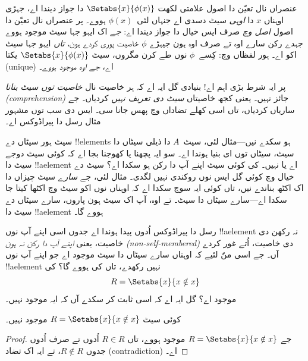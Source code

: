 \documentclass[../../../include/open-logic-section]{subfiles}
\begin{document}

عنصراں نال تعیّن دا اصول علامتی لکھت $\Setabs{x}{\phi(x)}$ دا جواز دیندا
اے، جہڑی اوہناں $x$ دا \emph{اوہی} سیٹ دسدی اے جنہاں لئی~$\phi(x)$
ہووے۔ پر عنصراں نال تعیّن دا اصول \emph{اصل وچ} صرف ایس خیال دا جواز
دیندا اے: \emph{جے} اک ایہو جہا سیٹ موجود ہووے جہدے رکن سارے اوہ تے صرف
اوہ ہون جیہڑے $\phi$ خاصیت پوری کردے ہون، \emph{تاں} ایہو جہا سیٹ اکو اے۔
ہور لفظاں وچ: کِسے~$\phi$ نوں طے کرن مگروں، سیٹ
$\Setabs{x}{\phi(x)}$ یکتا (unique) اے،
\emph{جے اوہ موجود ہووے}۔

پر ایہ شرط بڑی اہم اے!{} بنیادی گل ایہ اے کہ ہر خاصیت نال
\emph{خاصیت توں سیٹ بنانا (comprehension)} جائز نہیں۔ یعنی کجھ خاصیتاں
\emph{سیٹ دی تعریف نہیں} کردیاں۔ جے ساریاں کردیاں، تاں اسی کھلے تضاداں
وچ پھس جانا سی۔ ایس دی سب توں مشہور مثال رسل دا پیراڈوکس اے۔

سیٹ ہور سیٹاں دے !!{element}s ہو سکدے نیں---مثال لئی، سیٹ~$A$ دا ذیلی
سیٹاں دا سیٹ، سیٹاں توں ای بنیا ہوندا اے۔ سو ایہ پچھنا یا کھوجنا بجا اے
کہ کوئی سیٹ دوجے سیٹ دا !!a{element} اے یا نہیں۔ کی کوئی سیٹ اپنے آپ دا
رکن ہو سکدا اے؟ سیٹ دے خیال وچ کوئی گل ایس نوں روکندی نہیں لگدی۔ مثال
لئی، جے \emph{سارے} سیٹ چیزاں دا اک اکٹھ بناندے نیں، تاں کوئی ایہ سوچ
سکدا اے کہ اوہناں نوں اکو سیٹ وچ اکٹھا کیتا جا سکدا اے---سارے سیٹاں دا
سیٹ۔ تے اوہ، آپ اک سیٹ ہون پاروں، سارے سیٹاں دے سیٹ دا !!a{element}
ہووے گا۔

رسل دا پیراڈوکس اُدوں پیدا ہوندا اے جدوں اسی اپنے آپ نوں !!a{element} نہ
رکھن دی خاصیت، یعنی \emph{اپنے آپ دا رکن نہ ہون (non-self-membered)} دی
خاصیت، اُتے غور کردے آں۔ جے اسی منّ لئیے کہ اوہناں سارے سیٹاں دا سیٹ موجود اے جو اپنے آپ نوں
!!a{element} نہیں رکھدے، تاں کی ہووے گا؟ کی
\[
R = \Setabs{x}{x \notin x}
\]
موجود اے؟ گل ایہ اے کہ اسی ثابت کر سکدے آں کہ ایہ موجود نہیں۔

\begin{thm}
	کوئی سیٹ $R = \Setabs{x}{x \notin x}$ موجود نہیں۔
\end{thm}

\begin{proof}
جے $R = \Setabs{x}{x \notin x}$ موجود ہووے، تاں
$R \in R$ اُدوں تے صرف اُدوں جدوں $R \notin R$، تے ایہ اک تضاد
(contradiction) اے۔
\end{proof}
\end{document}
